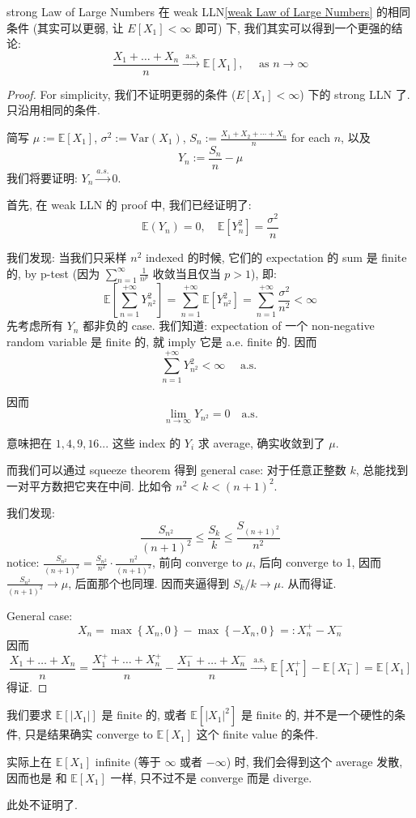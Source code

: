 \begin{theorem}{strong Law of Large Numbers}
在 weak LLN\ref{weak Law of Large Numbers} 
的相同条件 (其实可以更弱,
让 $E[X_1] < \infty$ 即可) 下, 
我们其实可以得到一个更强的结论:
$$
\frac{X_1+\ldots+X_n}{n} \xrightarrow{\text { a.s. }} \mathbb{E}\left[X_1\right], \quad \text { as } n \rightarrow \infty
$$
\end{theorem}
\begin{proof}
For simplicity,
我们不证明更弱的条件 ($E[X_1] < \infty$) 
下的 strong LLN 了. 只沿用相同的条件.

简写 $\mu:= \mathbb{E}[X_1]$,
$\sigma^2 := \text{Var}(X_1)$, 
$S_n:= \frac{X_1 + X_2 + \cdots +X_n}{n}$ for each $n$,
以及
$$
Y_n := 
\frac{S_n}{n} - \mu 
$$
我们将要证明: $Y_n \overset{a.s.}{\longrightarrow} 0$.

首先, 在 weak LLN 的 proof 中, 我们已经证明了:
$$ 
\mathbb{E}(Y_n) = 0, \quad \mathbb{E}[Y_n^2]
= \frac{\sigma^2}{n}
 $$

我们发现: 当我们只采样 $n^2$ indexed 
的时候, 它们的 expectation 的 sum 是 finite 的, 
by p-test 
(因为 $\sum_{n=1}^\infty \frac{1}{n^p}$ 收敛当且仅当 $p > 1$),
即:
$$ \mathbb{E}\left[\sum_{n=1}^{+\infty} Y_{n^2}^2\right]=\sum_{n=1}^{+\infty} \mathbb{E}\left[Y_{n^2}^2\right]=\sum_{n=1}^{+\infty} \frac{\sigma^2}{n^2}<\infty
 $$
 先考虑所有 $Y_n$ 都非负的 case.  
我们知道: expectation of 一个 
non-negative random variable 是 finite 的, 
就 imply 它是 a.e. finite 的. 
因而 
$$
\sum_{n=1}^{+\infty} Y_{n^2}^2<\infty \quad \text { a.s. }
 $$

因而
$$ 
\lim_{n\to\infty} Y_{n^2} = 0 \quad \text{a.s.}
 $$

意味把在 $1, 4, 9, 16...$ 这些 index 的 
$Y_i$ 求 average, 确实收敛到了 $\mu$.

而我们可以通过 squeeze theorem 得到 general case:
对于任意正整数 $k$, 总能找到一对平方数把它夹在中间. 
比如令 $n^2 < k < (n+1)^2$.

我们发现:
$$ \frac{S_{n^2}}{(n+1)^2} \leq \frac{S_k}{k} \leq \frac{S_{(n+1)^2}}{n^2} $$
notice:
$\frac{S_{n^2}}{(n+1)^2} = \frac{S_{n^2}}{n^2} \cdot \frac{n^2}{(n+1)^2}$, 
前向 converge to $\mu$, 后向 converge to 1,
因而 $\frac{S_{n^2}}{(n+1)^2}\to \mu$, 后面那个也同理. 
因而夹逼得到 $S_k/k \to \mu$. 从而得证.

General case: 
$$
X_n=\max \left\{X_n, 0\right\}-\max \left\{-X_n, 0\right\}=: X_n^{+}-X_n^{-}$$
因而
$$
\frac{X_1+\ldots+X_n}{n}=\frac{X_1^{+}+\ldots+X_n^{+}}{n}-\frac{X_1^{-}+\ldots+X_n^{-}}{n} \xrightarrow{\text { a.s. }} \mathbb{E}\left[X_1^{+}\right]-\mathbb{E}\left[X_1^{-}\right]=\mathbb{E}\left[X_1\right]
$$
得证. 
\end{proof}
\begin{remark}
我们要求 $\mathbb{E}[|X_1|]$ 是 finite 的,
或者 $\mathbb{E}[|X_1|^2]$ 是 finite 的,
并不是一个硬性的条件, 只是结果确实 converge to 
$\mathbb{E}[X_1]$ 这个 finite value 的条件. 

实际上在 $\mathbb{E}[X_1]$ infinite (等于 $\infty$ 或者
$-\infty$) 时, 
我们会得到这个 average 发散, 因而也是
和 $\mathbb{E}[X_1]$ 一样, 只不过不是 converge 而是 diverge. 

此处不证明了.
\end{remark}



